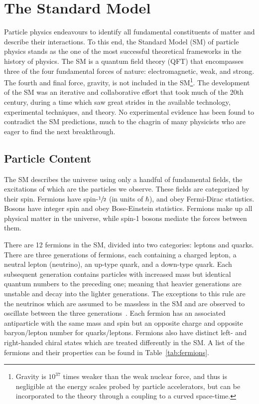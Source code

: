 \chapter{The Standard Model}
\label{ch:sm}

Particle physics endeavours to identify all fundamental constituents of matter and describe their interactions.
To this end, the Standard Model (SM) of particle physics stands as the one of the most successful theoretical frameworks in the history of physics.
The SM is a quantum field theory (QFT) that encompasses three of the four fundamental forces of nature: electromagnetic, weak, and strong.
The fourth and final force, gravity, is not included in the SM\footnote{Gravity is $10^{37}$ times weaker than the weak nuclear force, and thus is negligible at the energy scales probed by particle accelerators, but can be incorporated to the theory through a coupling to a curved space-time.}.
The development of the SM was an iterative and collaborative effort that took much of the 20th century, during a time which saw great strides in the available technology, experimental techniques, and theory.
No experimental evidence has been found to contradict the SM predictions, much to the chagrin of many physicists who are eager to find the next breakthrough.

\section{Particle Content}

The SM describes the universe using only a handful of fundamental fields, the excitations of which are the particles we observe.
These fields are categorized by their spin.
Fermions have spin-$\sfrac{1}{2}$ (in units of $\hbar$), and obey Fermi-Dirac statistics.
Bosons have integer spin and obey Bose-Einstein statistics.
Fermions make up all physical matter in the universe, while spin-1 bosons mediate the forces between them.

There are 12 fermions in the SM, divided into two categories: leptons and quarks.
There are three generations of fermions, each containing a charged lepton, a neutral lepton (neutrino), an up-type quark, and a down-type quark.
Each subsequent generation contains particles with increased mass but identical quantum numbers to the preceding one; meaning that heavier generations are unstable and decay into the lighter generations.
The exceptions to this rule are the neutrinos which are assumed to be massless in the SM and are observed to oscillate between the three generations~\cite{SearchNeutrinosSun, NeutrinoOsc}.
Each fermion has an associated antiparticle with the same mass and spin but an opposite charge and opposite baryon/lepton number for quarks/leptons.
Fermions also have distinct left- and right-handed chiral states which are treated differently in the SM\@.
A list of the fermions and their properties can be found in Table~\ref{tab:fermions}.

